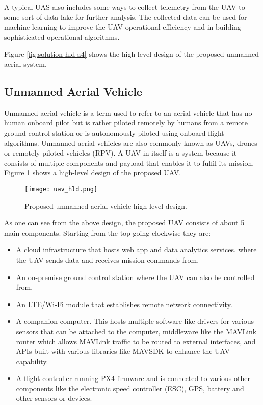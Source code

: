 A typical UAS also includes some ways to collect telemetry from the UAV to some sort of data-lake for further analysis. The collected data can be used for machine learning to improve the UAV operational efficiency and in building sophisticated operational algorithms.

Figure \ref{fig:solution-hld-a4} shows the high-level design of the proposed unmanned aerial system.



\subsection{Unmanned Aerial Vehicle}
\label{subsec:uav}

Unmanned aerial vehicle is a term used to refer to an aerial vehicle that has no human onboard pilot but is rather piloted remotely by humans from a remote ground control station or is autonomously piloted using onboard flight algorithms. Unmanned aerial vehicles are also commonly known as UAVs, drones or remotely piloted vehicles (RPV). A UAV in itself is a system because it consists of multiple components and payload that enables it to fulfil its mission. Figure \ref{fig:uav-hld} shows a high-level design of the proposed UAV.

\begin{figure}[H]
    \centering \texttt{[image: uav\_hld.png]}
    \caption{Proposed unmanned aerial vehicle high-level design.}
    \label{fig:uav-hld}
\end{figure}

As one can see from the above design, the proposed UAV consists of about 5 main components. Starting from the top going clockwise they are:
\begin{itemize}
    \item A cloud infrastructure that hosts web app and data analytics services, where the UAV sends data and receives mission commands from.
    \item An on-premise ground control station where the UAV can also be controlled from.
    \item An LTE/Wi-Fi module that establishes remote network connectivity.
    \item A companion computer. This hosts multiple software like drivers for various sensors that can be attached to the computer, middleware like the MAVLink router which allows MAVLink traffic to be routed to external interfaces, and APIs built with various libraries like MAVSDK\cite{mavsdk} to enhance the UAV capability.
    \item A flight controller running PX4 firmware and is connected to various other components like the electronic speed controller (ESC), GPS, battery and other sensors or devices.
\end{itemize}

